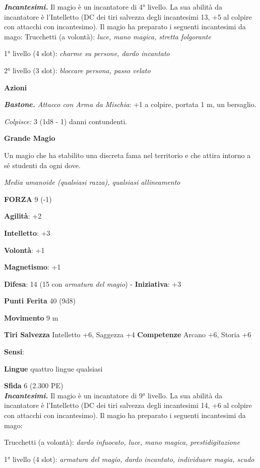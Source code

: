 \begin{multicols}{2}
\emph{\textbf{Incantesimi.}} Il magio è un incantatore di 4° livello. La
sua abilità da incantatore è l'Intelletto (DC dei tiri salvezza degli
incantesimi 13, +5 al colpire con attacchi con incantesimo). Il magio ha
preparato i seguenti incantesimi da mago: Trucchetti (a volontà):
\emph{luce, mano magica, stretta folgorante}

1° livello (4 slot): \emph{charme su persone, dardo incantato}

2° livello (3 slot): \emph{bloccare persona, passo velato}

\smallskip\textbf{Azioni}

\emph{\textbf{Bastone.} Attacco con Arma da Mischia}: +1 a colpire,
portata 1 m, un bersaglio.

\emph{Colpisce:} 3 (1d8 - 1) danni contundenti.

\textbf{Grande Magio}

Un magio che ha stabilito una discreta fama nel territorio e che attira
intorno a sé studenti da ogni dove.

\emph{Media umanoide (qualsiasi razza), qualsiasi allineamento}

\textbf{FORZA} 9 (-1)

\textbf{Agilità}: +2

\textbf{Intelletto}: +3

\textbf{Volontà}: +1

\textbf{Magnetismo}: +1

\textbf{Difesa}: 14 (15 con \emph{armatura del magio}) - \textbf{Iniziativa}: +3

\textbf{Punti Ferita} 40 (9d8)

\textbf{Movimento} 9 m

\textbf{Tiri Salvezza} Intelletto +6, Saggezza +4 \textbf{Competenze}
Arcano +6, Storia +6

\textbf{Sensi}: 

\textbf{Lingue} quattro lingue qualsiasi

\textbf{Sfida} 6 (2.300 PE)\smallskip\\

\emph{\textbf{Incantesimi.}} Il magio è un incantatore di 9° livello. La
sua abilità da incantatore è l'Intelletto (DC dei tiri salvezza degli
incantesimi 14, +6 al colpire con attacchi con incantesimo). Il magio ha
preparato i seguenti incantesimi da mago:

Trucchetti (a volontà): \emph{dardo infuocato, luce, mano magica,}
\emph{prestidigitazione}

1° livello (4 slot): \emph{armatura del magio, dardo incantato,}
\emph{individuare magia, scudo}


\end{multicols}
